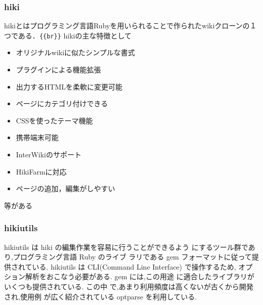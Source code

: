 \subsubsection{hiki}
hikiとはプログラミング言語Rubyを用いられることで作られたwikiクローンの１つである．\verb|{{br}}|
hikiの主な特徴として
\begin{itemize}
\item オリジナルwikiに似たシンプルな書式
\item プラグインによる機能拡張
\item 出力するHTMLを柔軟に変更可能
\item ページにカテゴリ付けできる
\item CSSを使ったテーマ機能
\item 携帯端末可能
\item InterWikiのサポート
\item HikiFarmに対応
\item ページの追加，編集がしやすい
\end{itemize}
等がある

\subsubsection{hikiutils}
hikiutils は hiki の編集作業を容易に行うことができるよう にするツール群であり,プログラミング言語 Ruby のライブ ラリである gem フォーマットに従って提供されている. 
hikiutils は CLI(Command Line Interface) で操作するため, オプション解析をおこなう必要がある.
gem には,この用途 に適合したライブラリがいくつも提供されている.
この中 で,あまり利用頻度は高くないが古くから開発され,使用例 が広く紹介されている optparse を利用している.


